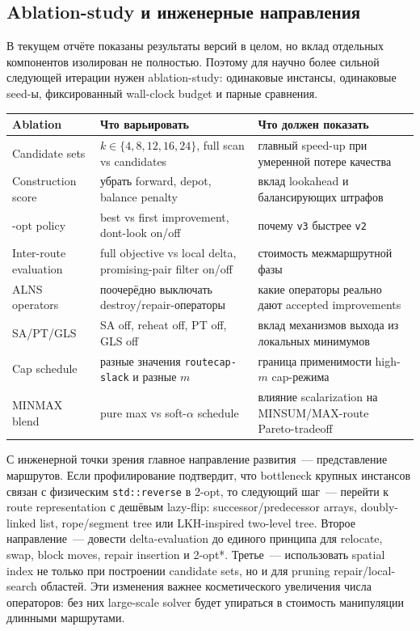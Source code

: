 \documentclass[14pt,a4paper]{extarticle}
\begin{document}
\subsection{Ablation-study и инженерные направления}

В текущем отчёте показаны результаты версий в целом, но вклад отдельных компонентов изолирован не полностью. Поэтому для научно более сильной следующей итерации нужен ablation-study: одинаковые инстансы, одинаковые seed-ы, фиксированный wall-clock budget и парные сравнения.

\begin{longtable}{>{\raggedright\arraybackslash}p{}>{\raggedright\arraybackslash}p{}>{\raggedright\arraybackslash}p{}}
\toprule
\textbf{Ablation} & \textbf{Что варьировать} & \textbf{Что должен показать}\\
\midrule
\endhead
Candidate sets & $k\in\{4,8,12,16,24\}$, full scan vs candidates & главный speed-up при умеренной потере качества\\
Construction score & убрать forward, depot, balance penalty & вклад lookahead и балансирующих штрафов\\
2-opt policy & best vs first improvement, dont-look on/off & почему \texttt{v3} быстрее \texttt{v2}\\
Inter-route evaluation & full objective vs local delta, promising-pair filter on/off & стоимость межмаршрутной фазы\\
ALNS operators & поочерёдно выключать destroy/repair-операторы & какие операторы реально дают accepted improvements\\
SA/PT/GLS & SA off, reheat off, PT off, GLS off & вклад механизмов выхода из локальных минимумов\\
Cap schedule & разные значения \texttt{routecap-slack} и разные $m$ & граница применимости high-$m$ cap-режима\\
MINMAX blend & pure max vs soft-$\alpha$ schedule & влияние scalarization на MINSUM/MAX-route Pareto-tradeoff\\
\bottomrule
\end{longtable}

С инженерной точки зрения главное направление развития~--- представление маршрутов. Если профилирование подтвердит, что bottleneck крупных инстансов связан с физическим \texttt{std::reverse} в 2-opt, то следующий шаг~--- перейти к route representation с дешёвым lazy-flip: successor/predecessor arrays, doubly-linked list, rope/segment tree или LKH-inspired two-level tree. Второе направление~--- довести delta-evaluation до единого принципа для relocate, swap, block moves, repair insertion и 2-opt*. Третье~--- использовать spatial index не только при построении candidate sets, но и для pruning repair/local-search областей. Эти изменения важнее косметического увеличения числа операторов: без них large-scale solver будет упираться в стоимость манипуляции длинными маршрутами.
\end{document}
